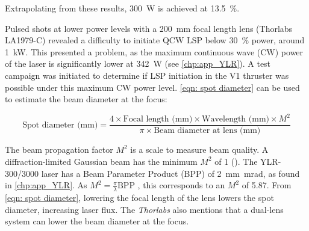             Extrapolating from these results, \qty{300}{W} is achieved at \qty{13.5}{\%}.

            Pulsed shots at lower power levels with a \qty{200}{mm} focal length lens (Thorlabs LA1979-C) revealed a difficulty to initiate QCW LSP below \qty{30}{\%} power, around \qty{1}{kW}. This presented a problem, as the maximum continuous wave (CW) power of the laser is significantly lower at \qty{342}{W} (see \autoref{chp:app_YLR}). A test campaign was initiated to determine if LSP initiation in the V1 thruster was possible under this maximum CW power level. \autoref{eqn: spot diameter} \cite{LaserSpotSize} can be used to estimate the beam diameter at the focus:
            
            \begin{equation}\label{eqn: spot diameter}
                \text{Spot diameter (mm)} = \frac{4 \times \text{Focal length (mm)} \times \text{Wavelength (mm)}\times M^2}{\pi \times \text{Beam diameter at lens (mm)}}
            \end{equation}

            The beam propagation factor $M^2$ is a scale to measure beam quality. A diffraction-limited Gaussian beam has the minimum $M^2$ of 1 (\textcite{hechtUnderstandingLasersEntry2019}). The YLR-300/3000 laser has a Beam Parameter Product (BPP) of \qty{2}{mm.mrad}, as found in \autoref{chp:app_YLR}. As $M^2 = \frac{\pi}{\lambda} \text{BPP}$ \cite{paschottaBeamParameterProduct}, this corresponds to an $M^2$ of 5.87. From \autoref{eqn: spot diameter}, lowering the focal length of the lens lowers the spot diameter, increasing laser flux. The \textit{Thorlabs} \textcite{LensTutorial} also mentions that a dual-lens system can lower the beam diameter at the focus.

